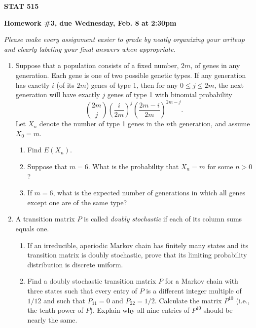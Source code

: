 \documentclass{article}
\begin{document}
\begin{center}
{\bf STAT 515}

{\bf Homework \#3, due Wednesday, Feb. 8 at 2:30pm}
\end{center}

{\it Please make every assignment easier to grade by neatly organizing your
writeup and clearly labeling your final answers when appropriate.}

\begin{enumerate}

  \item Suppose that a population consists of a fixed number, $2m$, of genes in
  any generation. Each gene is one of two possible genetic types. If any
  generation has exactly $i$ (of its $2m$) genes of type 1, then for any $0\le
  j\le 2m$, the next generation will have exactly $j$ genes of type 1 with
  binomial probability 
  \[ 
  {{2m}\choose j} \left( \frac{i}{2m} \right)^j \left( \frac{2m-i}{2m}
  \right)^{2m-j}.  
  \]
  Let $X_n$ denote the number of type 1 genes in the $n$th generation, 
  and assume $X_0=m$.

  \begin{enumerate}

    \item Find $E(X_n)$.

    \item Suppose that $m=6$. What is the probability that $X_n=m$ for some
    $n>0$?

    \item If $m=6$, what is the expected number of generations in which all
    genes except one are of the same type?

  \end{enumerate}

  \item A transition matrix $P$ is called {\em doubly stochastic} if each
  of its column sums equals one.  
  
  \begin{enumerate}
  
    \item If an irreducible, aperiodic Markov chain has finitely many states and
    its transition matrix is doubly stochastic, prove that its limiting probability
    distribution is discrete uniform.
    
    \item Find a doubly stochastic transition matrix $P$ for a Markov chain with
    three states such that every entry of $P$ is a different integer multiple of
    $1/12$ and such that $P_{11}=0$ and $P_{22}=1/2$. Calculate the matrix
    $P^{10}$ (i.e., the tenth power of $P$). Explain why all nine entries of
    $P^{10}$ should be nearly the same.


\end{enumerate}
\end{enumerate}
\end{document}
